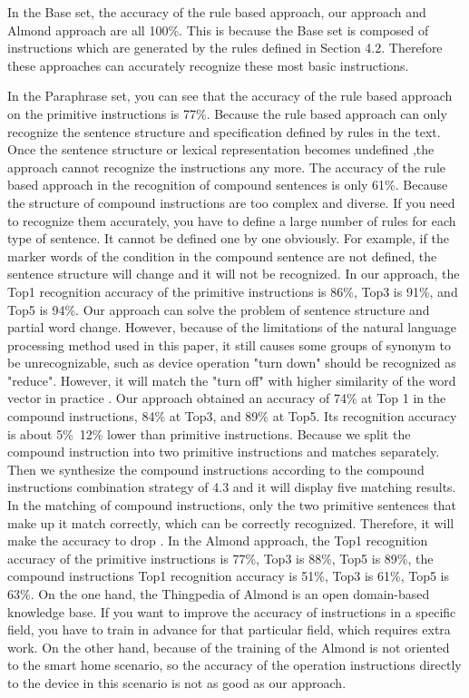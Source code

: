 In the Base set, the accuracy of the rule based approach, our approach and Almond approach are all 100\%. This is because the Base set is composed of instructions which are generated by the rules defined in Section 4.2. Therefore these approaches can accurately recognize these most basic instructions.

In the Paraphrase set, you can see that the accuracy of the rule based approach on the primitive instructions is 77\%. Because the rule based approach can only recognize the sentence structure and specification defined by rules in the text. Once the sentence structure or lexical representation becomes undefined ,the approach cannot recognize the instructions any more. The accuracy of the rule based approach in the recognition of compound sentences is only 61\%. Because the structure of compound instructions are too complex and diverse. If you need to recognize them accurately, you have to define a large number of rules for each type of sentence. It cannot be defined one by one obviously. For example, if the marker words of the condition in the compound sentence are not defined, the sentence structure will change and it will not be recognized. In our approach, the Top1 recognition accuracy of the primitive instructions is 86\%, Top3 is 91\%, and Top5 is 94\%. Our approach can solve the problem of sentence structure and partial word change. However, because of the limitations of the natural language processing method used in this paper, it still causes some groups of synonym to be unrecognizable, such as device operation "turn down" should be recognized as "reduce". However, it will match the "turn off" with higher similarity of the word vector in practice . Our approach obtained an accuracy of 74\% at Top 1 in the compound instructions, 84\% at Top3, and 89\% at Top5. Its recognition accuracy is about 5\%~12\% lower than primitive instructions. Because we split the compound instruction into two primitive instructions and matches separately. Then we synthesize the compound instructions according to the compound instructions combination strategy of 4.3 and it will display five matching results. In the matching of compound instructions, only the two primitive sentences that make up it match correctly, which can be correctly recognized. Therefore, it will make the accuracy to drop . In the Almond approach, the Top1 recognition accuracy of the primitive instructions is 77\%, Top3 is 88\%, Top5 is 89\%, the compound instructions Top1 recognition accuracy is 51\%, Top3 is 61\%, Top5 is 63\%. On the one hand, the Thingpedia of Almond is an open domain-based knowledge base. If you want to improve the accuracy of instructions in a specific field, you have to train in advance for that particular field, which requires extra work. On the other hand, because of the training of the Almond is not oriented to the smart home scenario, so the accuracy of the operation instructions directly to the device in this scenario is not as good as our approach.


